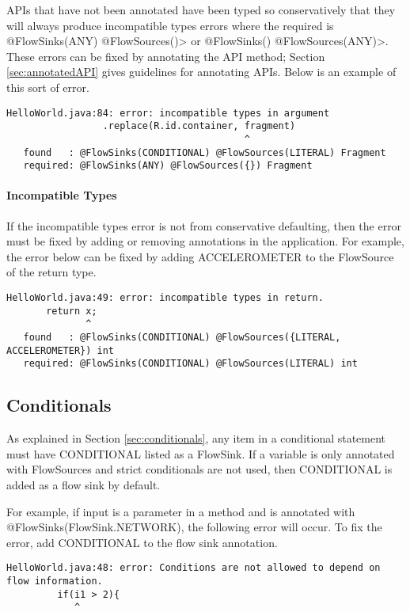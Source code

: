 APIs that have not been annotated have been typed so conservatively that they will always produce incompatible types errors where the required is \<@FlowSinks(ANY) @FlowSources({})> or 
\<@FlowSinks({}) @FlowSources(ANY)>.  These errors can be fixed by annotating the API method; 
Section \ref{sec:annotatedAPI} gives guidelines for annotating APIs. 
Below is an example of this sort of error.

\begin{Verbatim}
HelloWorld.java:84: error: incompatible types in argument
                 .replace(R.id.container, fragment)
                                          ^
   found   : @FlowSinks(CONDITIONAL) @FlowSources(LITERAL) Fragment
   required: @FlowSinks(ANY) @FlowSources({}) Fragment
\end{Verbatim}

\paragraph{Incompatible Types}

If the incompatible types error is not from conservative defaulting, then the error must be fixed by adding or
removing annotations in the application.  For example, the error below can be fixed by adding ACCELEROMETER to the FlowSource of the return type.  

\begin{Verbatim}
HelloWorld.java:49: error: incompatible types in return.
       return x;
              ^
   found   : @FlowSinks(CONDITIONAL) @FlowSources({LITERAL, ACCELEROMETER}) int
   required: @FlowSinks(CONDITIONAL) @FlowSources(LITERAL) int
\end{Verbatim}

\subsection{Conditionals}
As explained in Section \ref{sec:conditionals}, any item in a conditional statement must have CONDITIONAL listed as a FlowSink.  If a variable is only annotated with FlowSources and strict conditionals are not used, then CONDITIONAL is added as a flow sink by default. 

For example, if input is a parameter in a method and is annotated with @FlowSinks(FlowSink.NETWORK), the following error will occur.  To fix the error, add CONDITIONAL to the flow sink annotation.  

\begin{Verbatim}
HelloWorld.java:48: error: Conditions are not allowed to depend on flow information.
         if(i1 > 2){
            ^
\end{Verbatim}


